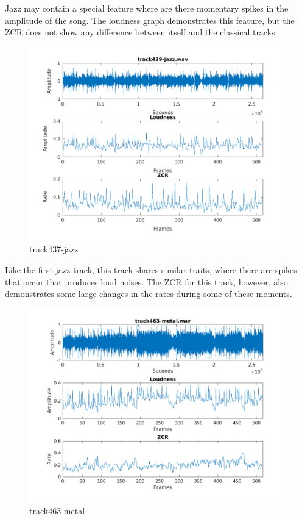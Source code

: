 \documentclass[11pt, a4paper]{article}
\begin{document}
Jazz may contain a special feature where are there momentary spikes in the amplitude of the song. The loudness graph demonstrates this feature, but the ZCR does not show any difference between itself and the classical tracks.

\begin{figure}[H]
    \centering
    \includegraphics[width=.8\textwidth]{track439-jazz-timedomain.png}
    \caption{track437-jazz}
\end{figure}

Like the first jazz track, this track shares similar traits, where there are spikes that occur that produces loud noises. The ZCR for this track, however, also demonstrates some large changes in the rates during some of these moments. 


\begin{figure}[H]
    \centering
    \includegraphics[width=.8\textwidth]{track463-metal-timedomain.png}
    \caption{track463-metal}
\end{figure}
\end{document}
